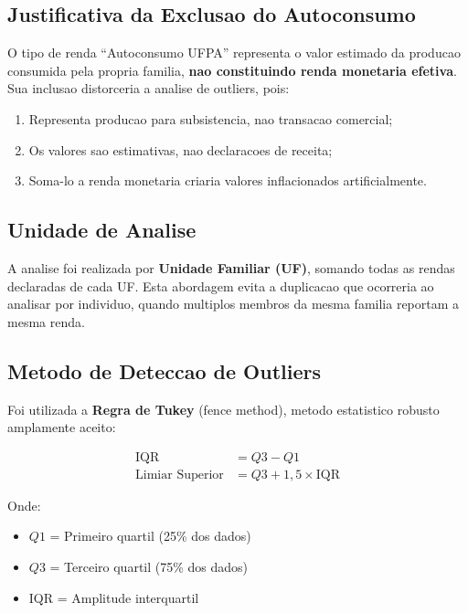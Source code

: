 \documentclass[11pt,a4paper]{article}
\begin{document}
\subsection{Justificativa da Exclusao do Autoconsumo}

O tipo de renda ``Autoconsumo UFPA'' representa o valor estimado da producao consumida
pela propria familia, \textbf{nao constituindo renda monetaria efetiva}. Sua inclusao
distorceria a analise de outliers, pois:

\begin{enumerate}
    \item Representa producao para subsistencia, nao transacao comercial;
    \item Os valores sao estimativas, nao declaracoes de receita;
    \item Soma-lo a renda monetaria criaria valores inflacionados artificialmente.
\end{enumerate}

\subsection{Unidade de Analise}

A analise foi realizada por \textbf{Unidade Familiar (UF)}, somando todas as rendas
declaradas de cada UF. Esta abordagem evita a duplicacao que ocorreria ao analisar
por individuo, quando multiplos membros da mesma familia reportam a mesma renda.

\subsection{Metodo de Deteccao de Outliers}

Foi utilizada a \textbf{Regra de Tukey} (fence method), metodo estatistico robusto
amplamente aceito:

\begin{align*}
\text{IQR} &= Q3 - Q1 \\
\text{Limiar Superior} &= Q3 + 1,5 \times \text{IQR}
\end{align*}

Onde:
\begin{itemize}
    \item $Q1$ = Primeiro quartil (25\% dos dados)
    \item $Q3$ = Terceiro quartil (75\% dos dados)
    \item IQR = Amplitude interquartil
\end{itemize}
\end{document}
